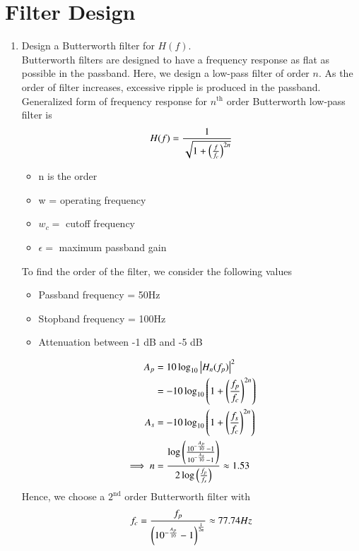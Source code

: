 \documentclass[journal,12pt,twocolumn]{IEEEtran}
\renewcommand\thesection{\arabic{section}}
\begin{document}
\section{Filter Design}
\begin{enumerate}[label=\thesection.\arabic*
,ref=\thesection.\theenumi]
\item Design a Butterworth filter for $H(f)$.\\
\solution
Butterworth filters are designed to have a frequency response as flat as possible in the passband. Here, we design a low-pass filter of order $n$. As the order of filter increases, excessive ripple is produced in the passband. \\
Generalized form of frequency response for $n^{\text{th}}$ order Butterworth low-pass filter is 
\begin{align}
	H(f) = \frac{1}{\sqrt{ 1 + \left(\frac{f}{f_c}\right)^{2n}}}
\end{align}
\begin{itemize}
	\item n is the order 
	\item w = operating frequency 
	\item $w_c =$ cutoff frequency 
	\item $\epsilon =$ maximum passband gain 
\end{itemize}
To find the order of the filter, we consider the following values 
\begin{itemize}
	\item Passband frequency = 50Hz
	\item Stopband frequency = 100Hz
	\item Attenuation between -1 dB and -5 dB
\end{itemize}
\begin{align}
	A_p &= 10 \log_{10}\left\vert H_n(f_p)\right\vert^2 \\
	&= -10\log_{10}\left(1+\left(\frac{f_p}{f_c}\right)^{2n}\right) \\
	A_s &= -10\log_{10}\left(1+\left(\frac{f_s}{f_c}\right)^{2n}\right) \\
	\implies n &=\frac{\log\left(\frac{10^{-\frac{A_p}{10}}-1}{ 10^{-\frac{A_s}{10}}-1}\right)}{2 \log \left(\frac{f_p}{f_s}\right)} \approx 1.53
\end{align}
Hence, we choose a $2^{\mathrm{nd}}$ order Butterworth filter with
\begin{align}
	f_c = \frac{f_p}{\left(10^{-\frac{A_p}{10}}-1\right)^{\frac{1}{2n}}} \approx 77.74Hz
\end{align}



\end{enumerate}
\end{document}
